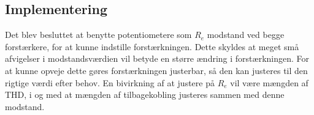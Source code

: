 \subsection{Implementering}
Det blev besluttet at benytte potentiometere som $R_e$ modstand ved begge forstærkere, for at kunne indstille forstærkningen. Dette skyldes at meget små afvigelser i modstandsværdien vil betyde en større ændring i forstærkningen. For at kunne opveje dette gøres forstærkningen justerbar, så den kan justeres til den rigtige værdi efter behov. En bivirkning af at justere på $R_e$ vil være mængden af THD, i og med at mængden af tilbagekobling justeres sammen med denne modstand.
